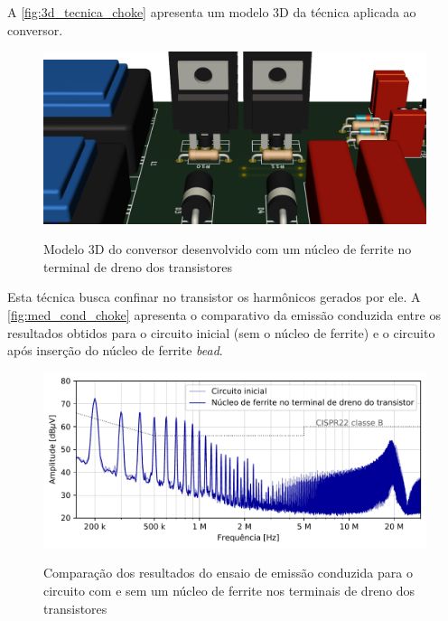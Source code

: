     A \autoref{fig:3d_tecnica_choke} apresenta um modelo 3D da técnica aplicada ao conversor.
    
    \begin{figure}[H]
    	\centering
    	\caption{Modelo 3D do conversor desenvolvido com um núcleo de ferrite no terminal de dreno dos transistores}
    	\includegraphics[scale=.35]{pdf/fotos/tecnica_choke2.png}
        \label{fig:3d_tecnica_choke}
    \end{figure}
    
    Esta técnica busca confinar no transistor os harmônicos gerados por ele. A \autoref{fig:med_cond_choke} apresenta o comparativo da emissão conduzida entre os resultados obtidos para o circuito inicial (sem o núcleo de ferrite) e o circuito após inserção do núcleo de ferrite \textit{bead}. 
    
    \begin{figure}[H]
    	\centering 
    	\caption{Comparação dos resultados do ensaio de emissão conduzida para o circuito com e sem um núcleo de ferrite nos terminais de dreno dos transistores}
    	\includegraphics[scale=.9]{pdf/cond/Choke bead no terminal de dreno do transistor.pdf}
    	\label{fig:med_cond_choke}
    \end{figure}
    

